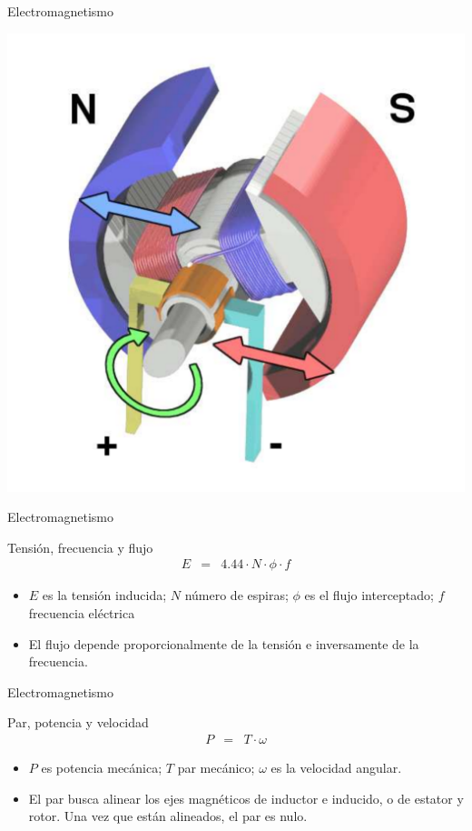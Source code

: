 \documentclass[xcolor={usenames,svgnames,dvipsnames}]{beamer}
\begin{document}
\begin{frame}[label={sec:orgba775b3}]{Electromagnetismo}
\begin{center}
\includegraphics[width=.9\linewidth]{../figs/Electric_motor_cycle_3.pdf}
\end{center}
\end{frame}

\begin{frame}[label={sec:org4f6f46f}]{Electromagnetismo}
\begin{block}{Tensión, frecuencia y flujo}
$$\begin{aligned}
  E & = & 4.44\cdot N\cdot\phi\cdot f\end{aligned}$$

\begin{itemize}
\item \(E\) es la tensión inducida; \(N\) número de espiras; \(\phi\) es el flujo
interceptado; \(f\) frecuencia eléctrica

\item El flujo depende proporcionalmente de la tensión e inversamente de la
frecuencia.
\end{itemize}
\end{block}
\end{frame}

\begin{frame}[label={sec:orgf4847d1}]{Electromagnetismo}
\begin{block}{Par, potencia y velocidad}
$$\begin{aligned}
  P & = & T\cdot\omega\end{aligned}$$

\begin{itemize}
\item \(P\) es potencia mecánica; \(T\) par mecánico; \(\omega\) es la velocidad
angular.

\item El par busca alinear los ejes magnéticos de inductor e inducido, o de
estator y rotor. Una vez que están alineados, el par es nulo.
\end{itemize}
\end{block}
\end{frame}
\end{document}
